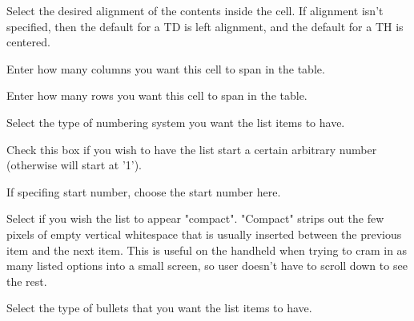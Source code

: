 
 Select the desired alignment of the contents
inside the cell. If alignment isn't specified, then the default for a TD is
left alignment, and the default for a TH is centered.

 Enter how many columns you want this cell to
span in the table.

 Enter how many rows you want this cell to
span in the table.


 Select the type of numbering system
you want the list items to have. \notimplemented

 Check this box if you wish to
have the list start a certain arbitrary number (otherwise will start at '1').
\notimplemented

 If specifing start number, choose the 
start number here. \notimplemented

 Select if you wish the list to appear 
"compact". "Compact" strips out the few pixels of empty vertical whitespace 
that is usually inserted between the previous item and the next item. This is 
useful on the handheld when trying to cram in as many listed options into a 
small screen, so user doesn't have to scroll down to see the rest. 
\notimplemented


 Select the type of bullets that you want 
the list items to have. \notimplemented

